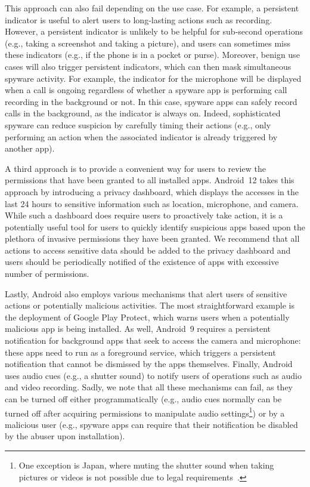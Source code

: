 This approach can also fail depending on the use case.  For example, a
persistent indicator is useful to alert users to long-lasting actions
such as recording. However, a persistent indicator is unlikely to be
helpful for sub-second operations (e.g., taking a screenshot and
taking a picture),
and users can sometimes miss these indicators (e.g., if the phone is
in a pocket or purse).  Moreover, benign use cases will also trigger
persistent indicators, which can then mask simultaneous spyware activity.  For example, the indicator for the microphone will be
displayed when a call is ongoing regardless of whether a spyware app
is performing call recording in the background or not.  In this case,
spyware apps can safely record calls in the background, as the
indicator is always on.  Indeed, sophisticated spyware can reduce
suspicion by carefully timing their actions (e.g., only performing an
action when the associated indicator is already triggered by another
app).

A third approach is to provide a convenient way for users to review the
permissions that have been granted to all installed apps.  Android~12 takes this
approach by introducing a privacy dashboard, which displays the
accesses in the last 24 hours to sensitive information such as location, microphone, and camera.
While such a dashboard does require users to proactively
take action, it is a potentially useful tool for users to quickly identify
suspicious apps based upon the plethora of invasive permissions they have been
granted. We
recommend that all actions to access sensitive data should be added to the
privacy dashboard and users should be periodically notified of the existence of apps with excessive number of permissions.

Lastly, Android also employs various mechanisms that alert users of sensitive actions or potentially malicious activities. 
The most straightforward example is the deployment of Google Play Protect, which warns users when a potentially malicious app is being installed. As well, Android~9 requires a persistent notification for background apps that seek to access the camera and microphone: these apps need to run as a foreground service, which triggers a persistent notification that cannot be dismissed by the apps themselves. Finally, Android uses audio cues (e.g., a shutter sound) to notify users of operations such as audio and video recording. Sadly, we note that all these mechanisms can fail, as they can be turned off either programmatically (e.g., audio cues normally can be
turned off after acquiring permissions to manipulate audio
settings\footnote{One exception is Japan, where muting the shutter sound when
taking pictures or videos is not possible due to legal
requirements~\cite{HowcanIt38:online}.}) or by a malicious user (e.g., spyware apps can require that their notification be disabled by the abuser upon installation).


